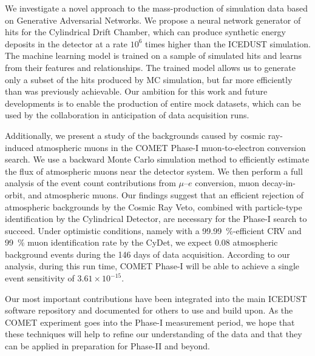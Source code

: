 We investigate a novel approach to the mass-production of simulation data based
on Generative Adversarial Networks. We propose a neural network generator of
hits for the Cylindrical Drift Chamber, which can produce synthetic energy
deposits in the detector at a rate $10^6$ times higher than the ICEDUST
simulation. The machine learning model is trained on a sample of simulated hits
and learns from their features and relationships. The trained model allows us to
generate only a subset of the hits produced by MC simulation, but far more
efficiently than was previously achievable. Our ambition for this work and
future developments is to enable the production of entire mock datasets, which
can be used by the collaboration in anticipation of data acquisition runs.

Additionally, we present a study of the backgrounds caused by cosmic ray-induced
atmospheric muons in the COMET Phase\nobreakdash-I muon-to-electron conversion search. We
use a backward Monte Carlo simulation method to efficiently estimate the flux of
atmospheric muons near the detector system. We then perform a full analysis of
the event count contributions from $\mu$--$e$ conversion, muon decay-in-orbit,
and atmospheric muons. Our findings suggest that an efficient rejection of
atmospheric backgrounds by the Cosmic Ray Veto, combined with particle-type
identification by the Cylindrical Detector, are necessary for the Phase\nobreakdash-I search
to succeed. Under optimistic conditions, namely with a
\SI{99.99}{\percent}-efficient CRV and \SI{99}{\percent} muon identification
rate by the CyDet, we expect 0.08 atmospheric background events during the 146
days of data acquisition. According to our analysis, during this run time, COMET
Phase\nobreakdash-I will be able to achieve a single event sensitivity of $3.61 \times
10^{-15}$.


Our most important contributions have been integrated into the main ICEDUST
software repository and documented for others to use and build upon. As the
COMET experiment goes into the Phase\nobreakdash-I measurement period, we hope that these
techniques will help to refine our understanding of the data and that they can
be applied in preparation for Phase\nobreakdash-II and beyond.